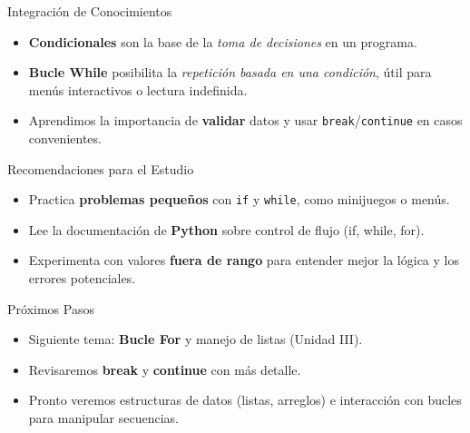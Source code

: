 \documentclass[10pt]{beamer}
\begin{document}
\begin{frame}{Integración de Conocimientos}
  \begin{itemize}
    \item \textbf{Condicionales} son la base de la \textit{toma de decisiones} en un programa.
    \item \textbf{Bucle While} posibilita la \textit{repetición basada en una condición}, útil para menús interactivos o lectura indefinida.
    \item Aprendimos la importancia de \textbf{validar} datos y usar \texttt{break}/\texttt{continue} en casos convenientes.
  \end{itemize}
\end{frame}

\begin{frame}{Recomendaciones para el Estudio}
  \begin{itemize}
    \item Practica \textbf{problemas pequeños} con \texttt{if} y \texttt{while}, como minijuegos o menús.
    \item Lee la documentación de \textbf{Python} sobre control de flujo (if, while, for).
    \item Experimenta con valores \textbf{fuera de rango} para entender mejor la lógica y los errores potenciales.
  \end{itemize}
\end{frame}

\begin{frame}{Próximos Pasos}
  \begin{itemize}
    \item Siguiente tema: \textbf{Bucle For} y manejo de listas (Unidad III).
    \item Revisaremos \textbf{break} y \textbf{continue} con más detalle.
    \item Pronto veremos estructuras de datos (listas, arreglos) e interacción con bucles para manipular secuencias.
  \end{itemize}
\end{frame}
\end{document}
